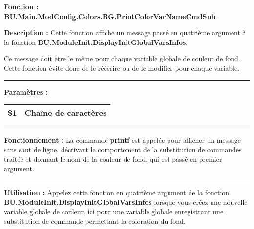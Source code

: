 \documentclass[a4paper,10pt]{article}
\begin{document}
\begin{justify}
    \textbf{Fonction : \color{func}BU.Main.ModConfig.Colors.BG.PrintColorVarNameCmdSub}
\end{justify}

\begin{justify}
    \textbf{Description :} Cette fonction affiche un message passé en quatrième argument à la fonction \textbf{\color{func}BU.ModuleInit.DisplayInitGlobalVarsInfos}.
\end{justify}

\begin{justify}
    Ce message doit être le même pour chaque variable globale de couleur de fond. Cette fonction évite donc de le réécrire ou de le modifier pour chaque variable.
\end{justify}


\par\noindent\rule{\textwidth}{0.4pt}

\begin{justify}
    \textbf{Paramètres :}

    \begin{tabular}{|l|l|}
        \hline
        \textbf{\color{vars}\$1} & Chaîne de caractères\\
        \hline
    \end{tabular}
\end{justify}


\par\noindent\rule{\textwidth}{0.4pt}

\begin{justify}
    \textbf{Fonctionnement :} La commande \textbf{\color{cmds}printf} est appelée pour afficher un message sans saut de ligne, décrivant le comportement de la substitution de commandes traitée et donnant le nom de la couleur de fond, qui est passé en premier argument.
\end{justify}


\par\noindent\rule{\textwidth}{0.4pt}

\begin{justify}
    \textbf{Utilisation :} Appelez cette fonction en quatrième argument de la fonction \textbf{\color{func}BU.ModuleInit.DisplayInitGlobalVarsInfos} lorsque vous créez une nouvelle variable globale de couleur, ici pour une variable globale enregistrant une substitution de commande permettant la coloration du fond.
\end{justify}
\end{document}

